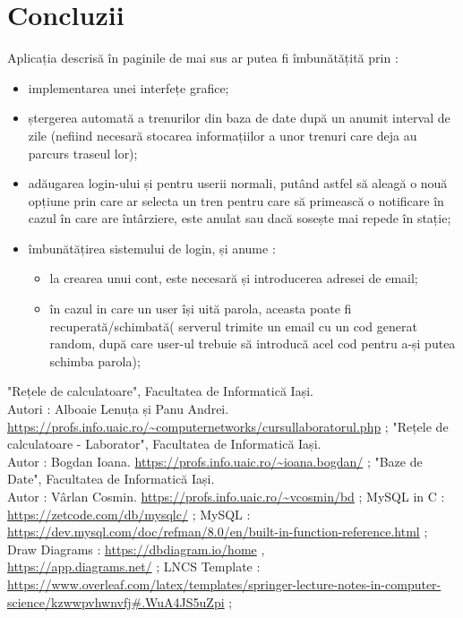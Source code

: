 \documentclass[runningheads]{llncs}
\begin{document}
    \section{Concluzii}
Aplicația descrisă în paginile de mai sus ar putea fi îmbunătățită prin : 
\begin{itemize}
    \item implementarea unei interfețe grafice;
    \item ștergerea automată a trenurilor din baza de date după un anumit interval de zile (nefiind necesară stocarea informațiilor a unor trenuri care deja au parcurs traseul lor);
    \item adăugarea login-ului și pentru userii normali, putând astfel să aleagă o nouă opțiune prin care ar selecta un tren pentru care să primească o notificare în cazul în care are întârziere, este anulat sau dacă sosește mai repede în stație;
    \item îmbunătățirea sistemului de login, și anume :
        \begin{itemize}
            \item la crearea unui cont, este necesară și introducerea adresei de email;
            \item în cazul in care un user își uită parola, aceasta poate fi recuperată/schimbată( serverul trimite un email cu un cod generat random, după care user-ul trebuie să introducă acel cod pentru a-și putea schimba parola);
        \end{itemize}
\end{itemize}
\begin{thebibliography}{2}
\bibitem{} "Rețele de calculatoare", Facultatea de Informatică Iași.\\
Autori : Alboaie Lenuța și Panu Andrei. \\ \url{https://profs.info.uaic.ro/~computernetworks/cursullaboratorul.php} ;
\bibitem{} "Rețele de calculatoare - Laborator", Facultatea de Informatică Iași.\\
Autor : Bogdan Ioana. \url{https://profs.info.uaic.ro/~ioana.bogdan/} ;
\bibitem{} "Baze de Date", Facultatea de Informatică Iași.\\
Autor : Vârlan Cosmin. \url{https://profs.info.uaic.ro/~vcosmin/bd} ;
\bibitem{} MySQL in C : \url{https://zetcode.com/db/mysqlc/} ;
\bibitem{} MySQL : \url{https://dev.mysql.com/doc/refman/8.0/en/built-in-function-reference.html} ;
\bibitem{} Draw Diagrams : \url{https://dbdiagram.io/home} , \\ \url{https://app.diagrams.net/} ;
\bibitem{} LNCS Template : \\ \url{https://www.overleaf.com/latex/templates/springer-lecture-notes-in-computer-science/kzwwpvhwnvfj#.WuA4JS5uZpi} ;
\end{thebibliography}
\end{document}
